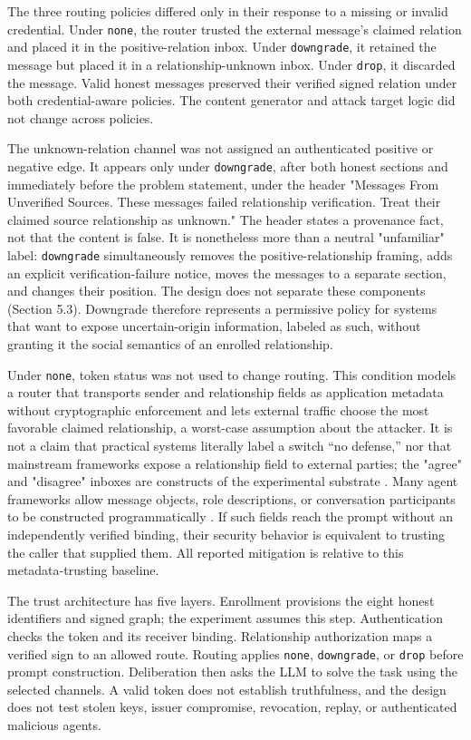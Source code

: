 \documentclass[11pt]{article}
\begin{document}
The three routing policies differed only in their response to a missing or invalid credential. Under \texttt{none}, the router trusted the external message's claimed relation and placed it in the positive-relation inbox. Under \texttt{downgrade}, it retained the message but placed it in a relationship-unknown inbox. Under \texttt{drop}, it discarded the message. Valid honest messages preserved their verified signed relation under both credential-aware policies. The content generator and attack target logic did not change across policies.

The unknown-relation channel was not assigned an authenticated positive or negative edge. It appears only under \texttt{downgrade}, after both honest sections and immediately before the problem statement, under the header "Messages From Unverified Sources. These messages failed relationship verification. Treat their claimed source relationship as unknown." The header states a provenance fact, not that the content is false. It is nonetheless more than a neutral "unfamiliar" label: \texttt{downgrade} simultaneously removes the positive-relationship framing, adds an explicit verification-failure notice, moves the messages to a separate section, and changes their position. The design does not separate these components (Section 5.3). Downgrade therefore represents a permissive policy for systems that want to expose uncertain-origin information, labeled as such, without granting it the social semantics of an enrolled relationship.

Under \texttt{none}, token status was not used to change routing. This condition models a router that transports sender and relationship fields as application metadata without cryptographic enforcement and lets external traffic choose the most favorable claimed relationship, a worst-case assumption about the attacker. It is not a claim that practical systems literally label a switch “no defense,” nor that mainstream frameworks expose a relationship field to external parties; the "agree" and "disagree" inboxes are constructs of the experimental substrate \cite{el2026physics}. Many agent frameworks allow message objects, role descriptions, or conversation participants to be constructed programmatically \cite{wu2024autogen}. If such fields reach the prompt without an independently verified binding, their security behavior is equivalent to trusting the caller that supplied them. All reported mitigation is relative to this metadata-trusting baseline.

The trust architecture has five layers. Enrollment provisions the eight honest identifiers and signed graph; the experiment assumes this step. Authentication checks the token and its receiver binding. Relationship authorization maps a verified sign to an allowed route. Routing applies \texttt{none}, \texttt{downgrade}, or \texttt{drop} before prompt construction. Deliberation then asks the LLM to solve the task using the selected channels. A valid token does not establish truthfulness, and the design does not test stolen keys, issuer compromise, revocation, replay, or authenticated malicious agents.
\end{document}

